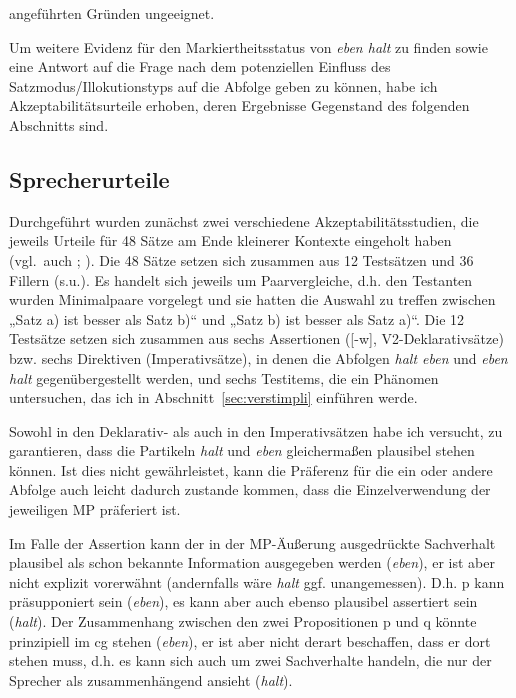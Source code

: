 angeführten Gründen ungeeignet.

Um weitere Evidenz für den Markiertheitsstatus von \textit{eben halt} zu finden sowie eine Antwort auf die Frage nach dem potenziellen Einfluss des Satzmodus/Illoku\-tionstyps auf die Abfolge geben zu können, habe ich Akzeptabilitätsurteile erhoben, deren Ergebnisse Gegenstand des folgenden Abschnitts sind.

\subsection{Sprecherurteile}
\label{sec:spu}
Durchgeführt wurden zunächst zwei verschiedene Akzeptabilitätsstudien, die jeweils Urteile für 48 Sätze am Ende kleinerer Kontexte eingeholt haben (vgl.\ auch \citealt[155--161]{Mueller2016b}; \citeyear[235--238]{Mueller2017a}). Die 48 Sätze setzen sich zusammen aus 12 Testsätzen und 36 Fillern (s.u.). Es handelt sich jeweils um Paarvergleiche, d.h. den Testanten wurden Minimalpaare vorgelegt und sie hatten die Auswahl zu treffen zwischen „Satz a) ist besser als Satz b)“ und „Satz b) ist besser als Satz a)“. Die 12 Testsätze setzen sich zusammen aus sechs Assertionen ([-w], V2-Deklarativsätze) bzw. sechs Direktiven (Imperativsätze), in denen die Abfolgen \textit{halt eben} und \textit{eben halt} gegenübergestellt werden, und sechs Testitems, die ein Phänomen untersuchen, das ich in Abschnitt~\ref{sec:verstimpli} einführen werde.

Sowohl in den Deklarativ- als auch in den Imperativsätzen habe ich versucht, zu garantieren, dass die Partikeln \textit{halt} und \textit{eben} gleichermaßen plausibel stehen können. Ist dies nicht gewährleistet, kann die Präferenz für die ein oder andere Abfolge auch leicht dadurch zustande kommen, dass die Einzelverwendung der jeweiligen MP präferiert ist.

Im Falle der Assertion kann der in der MP-Äußerung ausgedrückte Sachverhalt plausibel als schon bekannte Information ausgegeben werden (\textit{eben}), er ist aber nicht explizit vorerwähnt (andernfalls wäre \textit{halt} ggf. unangemessen). D.h. p kann präsupponiert sein (\textit{eben}), es kann aber auch ebenso plausibel assertiert sein (\textit{halt}). Der Zusammenhang zwischen den zwei Propositionen p und q könnte prinzipiell im cg stehen (\textit{eben}), er ist aber nicht derart beschaffen, dass er dort stehen muss, d.h. es kann sich auch um zwei Sachverhalte handeln, die nur der Sprecher als zusammenhängend ansieht (\textit{halt}). 

